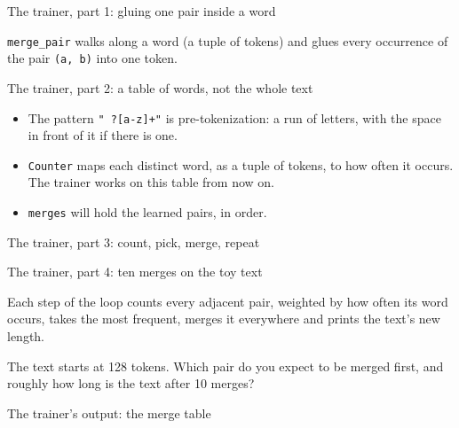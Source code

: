 \documentclass[aspectratio=169,11pt,t,\primeropts]{beamer}
\begin{document}
\begin{frame}{The trainer, part 1: gluing one pair inside a word}
  \vspace{1mm}
  {\small \texttt{merge\_pair} walks along a word (a tuple of tokens) and glues every occurrence of
  the pair \texttt{(a, b)} into one token.\par}
\end{frame}

\begin{frame}{The trainer, part 2: a table of words, not the whole text}
  \vspace{2mm}
  \begin{itemize}
    \item The pattern \texttt{" ?[a-z]+"} is pre-tokenization: a run of letters, with the space in
      front of it if there is one.
    \item \texttt{Counter} maps each distinct word, as a tuple of tokens, to how often it occurs.
      The trainer works on this table from now on.
    \item \texttt{merges} will hold the learned pairs, in order.
  \end{itemize}
\end{frame}

\begin{frame}{The trainer, part 3: count, pick, merge, repeat}
\end{frame}

\begin{frame}{The trainer, part 4: ten merges on the toy text}
  \renewcommand\codesize{\footnotesize}
  \vspace{2mm}
  {\small Each step of the loop counts every adjacent pair, weighted by how often its word occurs,
  takes the most frequent, merges it everywhere and prints the text's new length.\par}
  \vspace{3mm}
  \begin{keyidea}
    The text starts at 128 tokens. Which pair do you expect to be merged first, and roughly how
    long is the text after 10 merges?
  \end{keyidea}
\end{frame}

\begin{frame}{The trainer's output: the merge table}
  \renewcommand\codesize{\small}
\end{frame}
\end{document}

